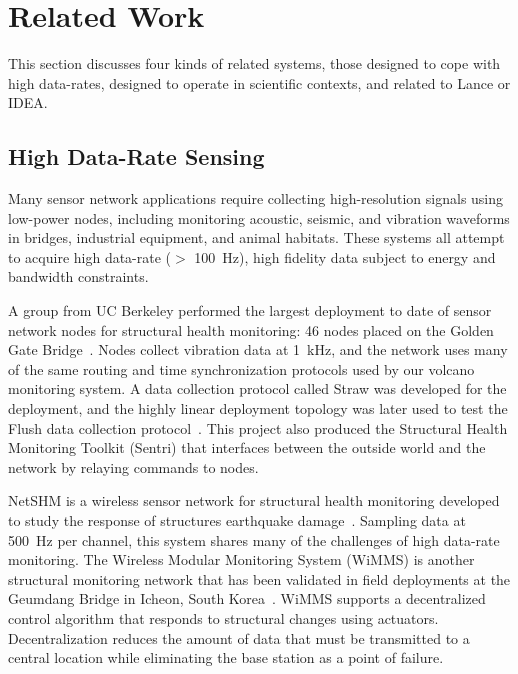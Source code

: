\section{Related Work}
\label{sec-relatedwork}

This section discusses four kinds of related systems, those designed to cope
with high data-rates, designed to operate in scientific contexts, and related
to Lance or IDEA.

\subsection{High Data-Rate Sensing}

Many sensor network applications require collecting high-resolution signals
using low-power nodes, including monitoring acoustic, seismic, and vibration
waveforms in bridges, industrial equipment, and animal habitats. These
systems all attempt to acquire high data-rate ($>$ 100~Hz), high fidelity data
subject to energy and bandwidth constraints.

A group from UC Berkeley performed the largest deployment to date of sensor
network nodes for structural health monitoring: 46 nodes placed on the Golden
Gate Bridge~\cite{ggb-ipsn07}. Nodes collect vibration data at 1~kHz, and the
network uses many of the same routing and time synchronization protocols used
by our volcano monitoring system. A data collection protocol called Straw was
developed for the deployment, and the highly linear deployment topology was
later used to test the Flush data collection protocol~\cite{flush-sensys07}.
This project also produced the Structural Health Monitoring Toolkit (Sentri)
that interfaces between the outside world and the network by relaying
commands to nodes.

NetSHM is a wireless sensor network for structural health monitoring
developed to study the response of structures earthquake
damage~\cite{netshm-ewsnsubmission,netshm-emnets05,wisan}. Sampling data at
500~Hz per channel, this system shares many of the challenges of high
data-rate monitoring. The Wireless Modular Monitoring System (WiMMS) is
another structural monitoring network that has been validated in field
deployments at the Geumdang Bridge in Icheon, South
Korea~\cite{wimms-lynch06}. WiMMS supports a decentralized control algorithm
that responds to structural changes using actuators. Decentralization reduces
the amount of data that must be transmitted to a central location while
eliminating the base station as a point of failure.

